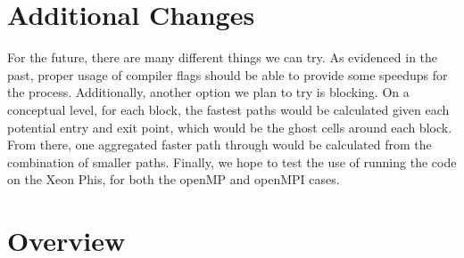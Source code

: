 \documentclass{article}
\begin{document}
	

\section{Additional Changes}
For the future, there are many different things we can try. As evidenced in the past, proper usage of compiler flags should be able to provide some speedups for the process. Additionally, another option we plan to try is blocking. On a conceptual level, for each block, the fastest paths would be calculated given each potential entry and exit point, which would be the ghost cells around each block. From there, one aggregated faster path through would be calculated from the combination of smaller paths. Finally, we hope to test the use of running the code on the Xeon Phis, for both the openMP and openMPI cases.

\section{Overview}

\begin{thebibliography}{1}

\end{thebibliography}
\end{document}
